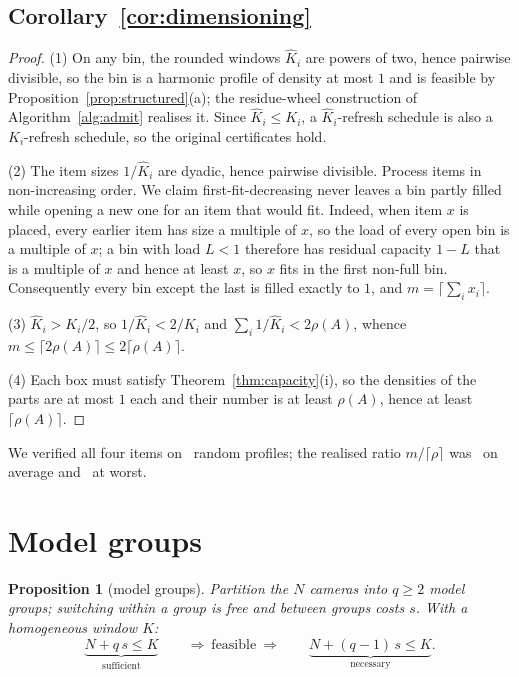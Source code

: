 \documentclass[preprint,review,12pt]{elsarticle}
\newtheorem{proposition}[theorem]{Proposition}
\theoremstyle{definition}
\newcommand{\Nc}{N}
\newcommand{\dens}{\rho}
\begin{document}
\subsection*{Corollary~\ref{cor:dimensioning}}
\begin{proof}
(1) On any bin, the rounded windows $\hat K_i$ are powers of two, hence pairwise divisible, so the
bin is a harmonic profile of density at most $1$ and is feasible by
Proposition~\ref{prop:structured}(a); the residue-wheel construction of Algorithm~\ref{alg:admit}
realises it. Since $\hat K_i\le K_i$, a $\hat K_i$-refresh schedule is also a $K_i$-refresh
schedule, so the original certificates hold.

(2) The item sizes $1/\hat K_i$ are dyadic, hence pairwise divisible. Process items in
non-increasing order. We claim first-fit-decreasing never leaves a bin partly filled while opening
a new one for an item that would fit. Indeed, when item $x$ is placed, every earlier item has size
a multiple of $x$, so the load of every open bin is a multiple of $x$; a bin with load $L<1$
therefore has residual capacity $1-L$ that is a multiple of $x$ and hence at least $x$, so $x$
fits in the first non-full bin. Consequently every bin except the last is filled exactly to $1$,
and $m=\lceil\sum_i x_i\rceil$.

(3) $\hat K_i>K_i/2$, so $1/\hat K_i<2/K_i$ and $\sum_i 1/\hat K_i<2\dens(A)$, whence
$m\le\lceil 2\dens(A)\rceil\le 2\lceil\dens(A)\rceil$.

(4) Each box must satisfy Theorem~\ref{thm:capacity}(i), so the densities of the parts are at most
$1$ each and their number is at least $\dens(A)$, hence at least $\lceil\dens(A)\rceil$.
\end{proof}

\noindent
We verified all four items on \numCfourTrials\ random profiles; the realised ratio
$m/\lceil\dens\rceil$ was \numCfourRatioMean\ on average and \numCfourRatioMax\ at worst.

\section{Model groups}\label{app:groups}

\begin{proposition}[model groups]\label{prop:groups}
Partition the $\Nc$ cameras into $q\ge2$ \emph{model groups}; switching within a group is free and
between groups costs $s$. With a homogeneous window $K$:
\[
\underbrace{\Nc+q\,s\le K}_{\text{sufficient}}
\qquad\Longrightarrow\ \text{feasible}\ \Longrightarrow\qquad
\underbrace{\Nc+(q-1)\,s\le K}_{\text{necessary}} .
\]
\end{proposition}
\end{document}
